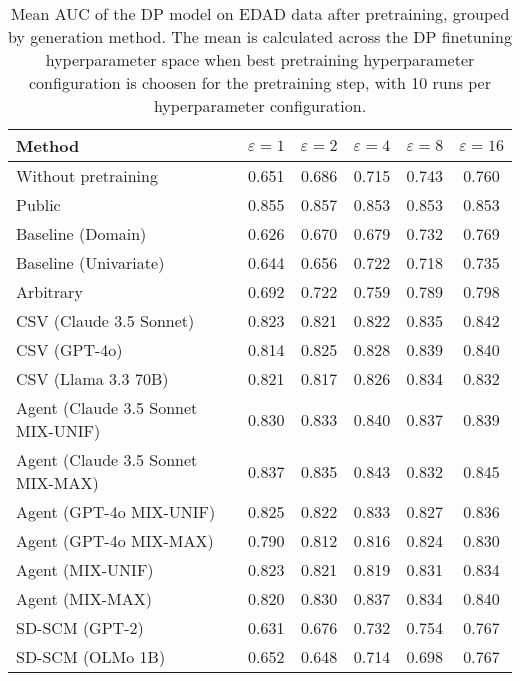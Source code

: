 \begin{table}[h!]
    \centering
    \caption{Mean AUC of the DP model on EDAD data after pretraining, grouped by generation method. The mean is calculated across the DP finetuning hyperparameter space when best pretraining hyperparameter configuration is choosen for the pretraining step, with 10 runs per hyperparameter configuration.}
    \label{tab:epsilon_comparison}
    \begin{tabular}{lccccc}
    \toprule
    Method & $\varepsilon=1$ & $\varepsilon=2$ & $\varepsilon=4$ & $\varepsilon=8$ & $\varepsilon=16$ \\
    \midrule
    Without pretraining & 0.651 & 0.686 & 0.715 & 0.743 & 0.760 \\
    \arrayrulecolor{black!50!}\midrule
    Public & \cellcolor{gold!30}0.855 & \cellcolor{gold!30}0.857 & \cellcolor{gold!30}0.853 & \cellcolor{gold!30}0.853 & \cellcolor{gold!30}0.853 \\
    \arrayrulecolor{black!50!}\midrule
    Baseline (Domain) & 0.626 & 0.670 & 0.679 & 0.732 & 0.769 \\
    Baseline (Univariate) & 0.644 & 0.656 & 0.722 & 0.718 & 0.735 \\
    \arrayrulecolor{black!50!}\midrule
    Arbitrary & 0.692 & 0.722 & 0.759 & 0.789 & 0.798 \\
    \arrayrulecolor{black!50!}\midrule
    CSV (Claude 3.5 Sonnet) & 0.823 & 0.821 & 0.822 & 0.835 & \cellcolor{bronze!30}0.842 \\
    CSV (GPT-4o) & 0.814 & 0.825 & 0.828 & \cellcolor{silver!30}0.839 & 0.840 \\
    CSV (Llama 3.3 70B) & 0.821 & 0.817 & 0.826 & 0.834 & 0.832 \\
    \arrayrulecolor{black!50!}\midrule
    Agent (Claude 3.5 Sonnet MIX-UNIF) & \cellcolor{bronze!30}0.830 & \cellcolor{bronze!30}0.833 & \cellcolor{bronze!30}0.840 & \cellcolor{bronze!30}0.837 & 0.839 \\
    Agent (Claude 3.5 Sonnet MIX-MAX) & \cellcolor{silver!30}0.837 & \cellcolor{silver!30}0.835 & \cellcolor{silver!30}0.843 & 0.832 & \cellcolor{silver!30}0.845 \\
    Agent (GPT-4o MIX-UNIF) & 0.825 & 0.822 & 0.833 & 0.827 & 0.836 \\
    Agent (GPT-4o MIX-MAX) & 0.790 & 0.812 & 0.816 & 0.824 & 0.830 \\
    Agent (MIX-UNIF) & 0.823 & 0.821 & 0.819 & 0.831 & 0.834 \\
    Agent (MIX-MAX) & 0.820 & 0.830 & 0.837 & 0.834 & 0.840 \\
    \arrayrulecolor{black!50!}\midrule
    SD-SCM (GPT-2) & 0.631 & 0.676 & 0.732 & 0.754 & 0.767 \\
    SD-SCM (OLMo 1B) & 0.652 & 0.648 & 0.714 & 0.698 & 0.767 \\
    \bottomrule
    \end{tabular}
\end{table}